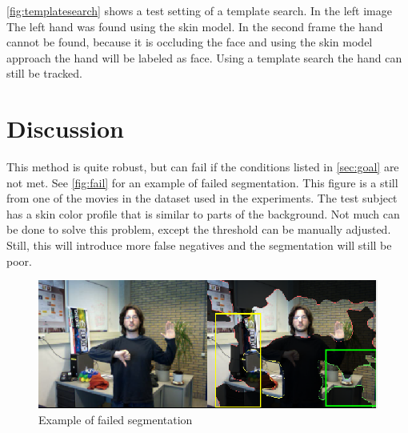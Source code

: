 \autoref{fig:templatesearch} shows a test setting of a template search. In the left image The left hand was found using the skin model. In the second frame the hand cannot be found, because it is occluding the face and using the skin model approach the hand will be labeled as face. Using a template search the hand can still be tracked.


\section{Discussion}
This method is quite robust, but can fail if the conditions listed in \autoref{sec:goal} are not met. See \autoref{fig:fail} for an example of failed segmentation. This figure is a still from one of the movies in the dataset used in the experiments. The test subject has a skin color profile that is similar to parts of the background. Not much can be done to solve this problem, except the threshold can be manually adjusted. Still, this will introduce more false negatives and the segmentation will still be poor.

\begin{figure}[htbp]
\center{}
\includegraphics[width=0.8\linewidth]{figures/fail.png}
\caption{Example of failed segmentation}
\label{fig:fail}
\end{figure}






